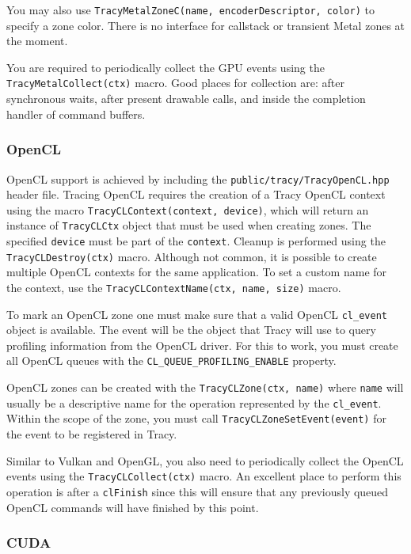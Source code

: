 \documentclass[hidelinks,titlepage,a4paper,twoside]{article}
\begin{document}
You may also use \texttt{TracyMetalZoneC(name, encoderDescriptor, color)} to specify a zone color. There is no interface for callstack or transient Metal zones at the moment.

You are required to periodically collect the GPU events using the \texttt{TracyMetalCollect(ctx)} macro. Good places for collection are: after synchronous waits, after present drawable calls, and inside the completion handler of command buffers.

\subsubsection{OpenCL}

OpenCL support is achieved by including the \texttt{public/tracy/TracyOpenCL.hpp} header file. Tracing OpenCL requires the creation of a Tracy OpenCL context using the macro \texttt{TracyCLContext(context, device)}, which will return an instance of \texttt{TracyCLCtx} object that must be used when creating zones. The specified \texttt{device} must be part of the \texttt{context}. Cleanup is performed using the \texttt{TracyCLDestroy(ctx)} macro. Although not common, it is possible to create multiple OpenCL contexts for the same application. To set a custom name for the context, use the \texttt{TracyCLContextName(ctx, name, size)} macro.

To mark an OpenCL zone one must make sure that a valid OpenCL \texttt{cl\_event} object is available. The event will be the object that Tracy will use to query profiling information from the OpenCL driver. For this to work, you must create all OpenCL queues with the \texttt{CL\_QUEUE\_PROFILING\_ENABLE} property.

OpenCL zones can be created with the \texttt{TracyCLZone(ctx, name)} where \texttt{name} will usually be a descriptive name for the operation represented by the \texttt{cl\_event}. Within the scope of the zone, you must call \texttt{TracyCLZoneSetEvent(event)} for the event to be registered in Tracy.

Similar to Vulkan and OpenGL, you also need to periodically collect the OpenCL events using the \texttt{TracyCLCollect(ctx)} macro. An excellent place to perform this operation is after a \texttt{clFinish} since this will ensure that any previously queued OpenCL commands will have finished by this point.

\subsubsection{CUDA}
\end{document}
